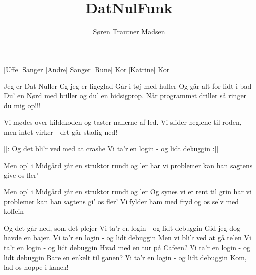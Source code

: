 \documentclass[a4paper,12pt]{article}
\title{DatNulFunk}
\author{Søren Trautner Madsen}
\begin{document}
\maketitle

\begin{roles}
[Uffe] Sanger
[Andre] Sanger
[Rune] Kor
[Katrine] Kor
\end{roles}

\begin{song}

 Jeg er Dat Nuller
 Og jeg er ligeglad
 Går i tøj med huller
 Og går alt for lidt i bad
 Du' en Nørd med briller
 og du' en hidsigprop.
 Når programmet driller
 så ringer du mig op!!!

Vi mødes over kildekoden
og taster nallerne af led.
Vi slider neglene til roden,
men intet virker - det går stadig ned!

||: Og det bli'r ved med at crashe
    Vi ta'r en login - og lidt debuggin :||

Men op' i Midgård går en struktor rundt og ler
har vi problemer kan han sagtens give os fler'


Men op' i Midgård går en struktor rundt og ler
Og synes vi er rent til grin
har vi problemer kan han sagtens gi' os fler'
Vi fylder ham med fryd og os selv med koffein

Og det går ned, som det plejer
Vi ta'r en login - og lidt debuggin
Gid jeg dog havde en bajer.
Vi ta'r en login - og lidt debuggin
Men vi bli'r ved at gå te'en
Vi ta'r en login - og lidt debuggin
Hvad med en tur på Cafeen?
Vi ta'r en login - og lidt debuggin
Bare en enkelt til ganen?
Vi ta'r en login - og lidt debuggin
Kom, lad os hoppe i kanen!

\end{song}
\end{document}

